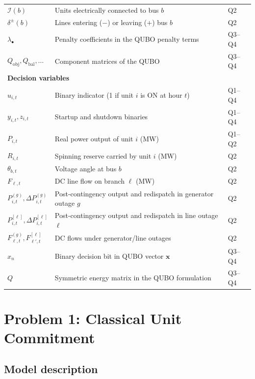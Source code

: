 \documentclass{apmcmthesis}
\begin{document}
\begin{longtable}{@{}p{2.4cm}p{6.2cm}p{2.2cm}@{}}
$\mathcal{I}(b)$ & Units electrically connected to bus $b$ & Q2\\
$\delta^{\pm}(b)$ & Lines entering (\(-\)) or leaving (\(+\)) bus $b$ & Q2\\
$\lambda_{\bullet}$ & Penalty coefficients in the QUBO penalty terms & Q3--Q4\\
$Q_{\text{obj}},Q_{\text{bal}},\dots$ & Component matrices of the QUBO & Q3--Q4\\
\midrule
\multicolumn{3}{l}{\textbf{Decision variables}}\\
$u_{i,t}$ & Binary indicator (1 if unit $i$ is ON at hour $t$) & Q1--Q4\\
$y_{i,t}, z_{i,t}$ & Startup and shutdown binaries & Q1--Q4\\
$P_{i,t}$ & Real power output of unit $i$ (MW) & Q1--Q2\\
$R_{i,t}$ & Spinning reserve carried by unit $i$ (MW) & Q2\\
$\theta_{b,t}$ & Voltage angle at bus $b$ & Q2\\
$F_{\ell,t}$ & DC line flow on branch $\ell$ (MW) & Q2\\
$P_{i,t}^{(g)}, \Delta P_{i,t}^{(g)}$ & Post-contingency output and redispatch in generator outage $g$ & Q2\\
$P_{i,t}^{[\ell]}, \Delta P_{i,t}^{[\ell]}$ & Post-contingency output and redispatch in line outage $\ell$ & Q2\\
$F_{\ell,t}^{(g)}, F_{\ell',t}^{[\ell]}$ & DC flows under generator/line outages & Q2\\
$x_{n}$ & Binary decision bit in QUBO vector $\mathbf{x}$ & Q3--Q4\\
$Q$ & Symmetric energy matrix in the QUBO formulation & Q3--Q4\\
\end{longtable}

\section{Problem 1: Classical Unit Commitment}

\subsection{Model description}
\end{document}
